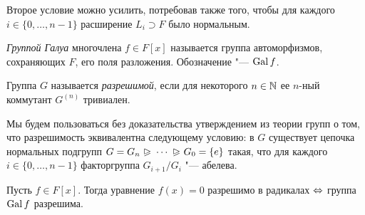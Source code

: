 \begin{note}
	Второе условие можно усилить, потребовав также того, чтобы для каждого $i \in \{0, \dotsc, n - 1\}$ расширение $L_i \supset F$ было нормальным.
\end{note}

\begin{definition}
	\textit{Группой Галуа} многочлена $f \in F[x]$ называется группа автоморфизмов, сохраняющих $F$, его поля разложения. Обозначение "--- $\operatorname{Gal}{f}$.
\end{definition}

\begin{definition}
	Группа $G$ называется \textit{разрешимой}, если для некоторого $n \in \mathbb{N}$ ее $n$-ный коммутант $G^{(n)}$ тривиален.
\end{definition}

\begin{note}
	Мы будем пользоваться без доказательства утверждением из теории групп о том, что разрешимость эквивалентна следующему условию: в $G$ существует цепочка нормальных подгрупп $G = G_n\varnormal\dotsb\varnormal G_0 = \{e\}$ такая, что для каждого $i \in \{0, \dotsc, n - 1\}$ факторгруппа $G_{i+1}/G_i$ "--- абелева.
\end{note}

\begin{theorem}
	Пусть $f \in F[x]$. Тогда уравнение $f(x) = 0$ разрешимо в радикалах $\Leftrightarrow$ группа $\operatorname{Gal}{f}$ разрешима.
\end{theorem}

